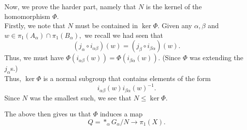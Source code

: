 \documentclass[12pt]{article}
\begin{document}
	Now, we prove the harder part, namely that $N$ is the kernel of the homomorphism $\Phi.$\\
	Firstly, we note that $N$ must be contained in $\ker \Phi.$ Given any $\alpha, \beta$ and $w \in \pi_1(A_\alpha)\cap\pi_1(B_\alpha),$ we recall we had seen that
	\begin{equation*} 
		(j_{\alpha}\circ i_{\alpha\beta})(w) = (j_{\beta}\circ i_{\beta\alpha})(w).
	\end{equation*}
	Thus, we must have $\Phi(i_{\alpha\beta}(w)) = \Phi(i_{\beta\alpha}(w)).$ (Since $\Phi$ was extending the $j_\alpha$s.)\\
	Thus, $\ker\Phi$ is a normal subgroup that contains elements of the form
	\begin{equation*} 
		i_{\alpha\beta}(w)i_{\beta\alpha}(w)^{-1}.
	\end{equation*}
	Since $N$ was the smallest such, we see that $N \le \ker\Phi.$

	The above then gives us that $\Phi$ induces a map
	\begin{equation*} 
		Q = *_\alpha G_\alpha/N \to \pi_1(X).
	\end{equation*}
\end{document}
